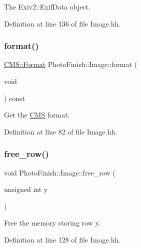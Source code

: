 The Exiv2\+::\+Exif\+Data object. 



Definition at line 136 of file Image.\+hh.

\mbox{\label{class_photo_finish_1_1_image_af3e7c8a8d2da4244df61aee4179f3285}} 
\subsubsection{\texorpdfstring{format()}{format()}}
{\footnotesize\ttfamily \hyperlink{class_c_m_s_1_1_format}{C\+M\+S\+::\+Format} Photo\+Finish\+::\+Image\+::format (\begin{DoxyParamCaption}\item[{void}]{ }\end{DoxyParamCaption}) const\hspace{0.3cm}{\ttfamily [inline]}}



Get the \hyperlink{namespace_c_m_s}{C\+MS} format. 



Definition at line 82 of file Image.\+hh.

\mbox{\label{class_photo_finish_1_1_image_a9dfe18a5ebeca8e9ddd66e71608d3ba6}} 
\subsubsection{\texorpdfstring{free\+\_\+row()}{free\_row()}}
{\footnotesize\ttfamily void Photo\+Finish\+::\+Image\+::free\+\_\+row (\begin{DoxyParamCaption}\item[{unsigned int}]{y }\end{DoxyParamCaption})\hspace{0.3cm}{\ttfamily [inline]}}



Free the memory storing row \textquotesingle{}y\textquotesingle{}. 



Definition at line 128 of file Image.\+hh.

